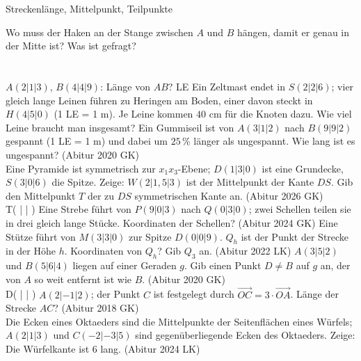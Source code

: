 \setcounter{aufgabe}{12}

\begin{aufgabe}{Streckenlänge, Mittelpunkt, Teilpunkte}
\begin{teile}
\teil Wo muss der Haken an der Stange zwischen $A$ und $B$ hängen, damit er genau in der Mitte ist? Was ist gefragt? \\  \\  \\ 
\teil $A(2 | 1 | 3)$, $B(4 | 4 | 9)$: Länge von $AB$? \leerfeld LE
\teil Ein Zeltmast endet in $S(2 | 2 | 6)$; vier gleich lange Leinen führen zu Heringen am Boden, einer davon steckt in $H(4 | 5 | 0)$ (1 LE = 1 m). Je Leine kommen $40$ cm für die Knoten dazu. Wie viel Leine braucht man insgesamt? \leerfeld[m]
\teil Ein Gummiseil ist von $A(3 | 1 | 2)$ nach $B(9 | 9 | 2)$ gespannt (1 LE = 1 m) und dabei um $25\,\%$ länger als ungespannt. Wie lang ist es ungespannt? \hfill (Abitur 2020 GK) \\ \leerfeld[m]
\teil Eine Pyramide ist symmetrisch zur $x_1x_3$-Ebene; $D(1 | 3 | 0)$ ist eine Grundecke, $S(3 | 0 | 6)$ die Spitze. Zeige: $W(2 | 1{,}5 | 3)$ ist der Mittelpunkt der Kante $DS$. Gib den Mittelpunkt $T$ der zu $DS$ symmetrischen Kante an. \hfill (Abitur 2026 GK) \\ T( \leerfeld | \leerfeld | \leerfeld )
\teil Eine Strebe führt von $P(9 | 0 | 3)$ nach $Q(0 | 3 | 0)$; zwei Schellen teilen sie in drei gleich lange Stücke. Koordinaten der Schellen? \hfill (Abitur 2024 GK)
\teil Eine Stütze führt von $M(3 | 3 | 0)$ zur Spitze $D(0 | 0 | 9)$. $Q_h$ ist der Punkt der Strecke in der Höhe $h$. Koordinaten von $Q_h$? Gib $Q_{3}$ an. \hfill (Abitur 2022 LK)
\teil $A(3 | 5 | 2)$ und $B(5 | 6 | 4)$ liegen auf einer Geraden $g$. Gib einen Punkt $D \ne B$ auf $g$ an, der von $A$ so weit entfernt ist wie $B$. \hfill (Abitur 2020 GK) \\ D( \leerfeld | \leerfeld | \leerfeld )
\teil $A(2 | -1 | 2)$; der Punkt $C$ ist festgelegt durch $\overrightarrow{OC} = 3 \cdot \overrightarrow{OA}$. Länge der Strecke $AC$? \hfill (Abitur 2018 GK) \\ \leerfeld
\teil Die Ecken eines Oktaeders sind die Mittelpunkte der Seitenflächen eines Würfels; $A(2 | 1 | 3)$ und $C(-2 | -3 | 5)$ sind gegenüberliegende Ecken des Oktaeders. Zeige: Die Würfelkante ist $6$ lang. \hfill (Abitur 2024 LK)
\end{teile}
\end{aufgabe}

